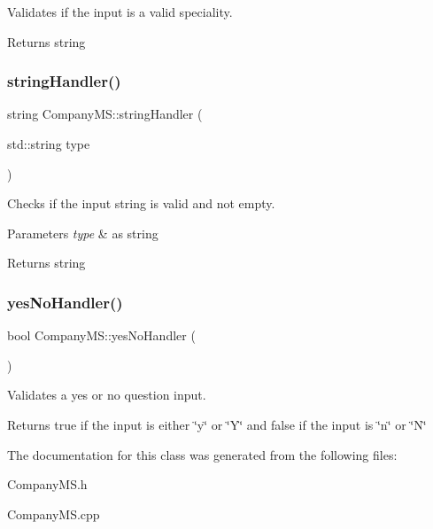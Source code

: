 Validates if the input is a valid speciality. 

\begin{DoxyReturn}{Returns}
string 
\end{DoxyReturn}
\mbox{\label{class_company_m_s_ad73ecf286947e5894a53b5e205600a05}} 
\subsubsection{\texorpdfstring{string\+Handler()}{stringHandler()}}
{\footnotesize\ttfamily string Company\+M\+S\+::string\+Handler (\begin{DoxyParamCaption}\item[{std\+::string}]{type }\end{DoxyParamCaption})}



Checks if the input string is valid and not empty. 


\begin{DoxyParams}{Parameters}
{\em type} & as string \\
\hline
\end{DoxyParams}
\begin{DoxyReturn}{Returns}
string 
\end{DoxyReturn}
\mbox{\label{class_company_m_s_a60ab36821370917191ec31d3a220bc0a}} 
\subsubsection{\texorpdfstring{yes\+No\+Handler()}{yesNoHandler()}}
{\footnotesize\ttfamily bool Company\+M\+S\+::yes\+No\+Handler (\begin{DoxyParamCaption}{ }\end{DoxyParamCaption})}



Validates a yes or no question input. 

\begin{DoxyReturn}{Returns}
true if the input is either \char`\"{}y\char`\"{} or \char`\"{}\+Y\char`\"{} and false if the input is \char`\"{}n\char`\"{} or \char`\"{}\+N\char`\"{} 
\end{DoxyReturn}


The documentation for this class was generated from the following files\+:\begin{DoxyCompactItemize}
\item 
Company\+M\+S.\+h\item 
Company\+M\+S.\+cpp\end{DoxyCompactItemize}
